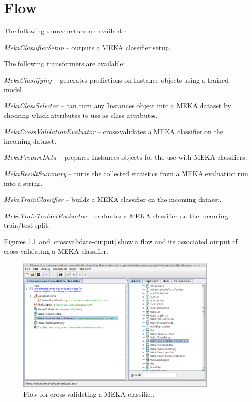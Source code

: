 \documentclass[a4paper]{book}
\begin{document}
\chapter{Flow}
The following source actors are available:
\begin{tight_itemize}
	\item \textit{MekaClassifierSetup} -- outputs a MEKA classifier setup.
\end{tight_itemize}
The following transformers are available:
\begin{tight_itemize}
	\item \textit{MekaClassifying} -- generates predictions on Instance objects
	using a trained model.
	\item \textit{MekaClassSelector} -- can turn any Instances object into
	a MEKA dataset by choosing which attributes to use as class attributes.
	\item \textit{MekaCrossValidationEvaluator} -- cross-validates a MEKA 
	classifier on the incoming dataset.
	\item \textit{MekaPrepareData} -- prepares Instances objects for the 
	use with MEKA classifiers.
	\item \textit{MekaResultSummary} -- turns the collected statistics from
	a MEKA evaluation run into a string.
	\item \textit{MekaTrainClassifier} -- builds a MEKA classifier on the
	incoming dataset.
	\item \textit{MekaTrainTestSetEvaluator} -- evaluates a MEKA classifier
	on the incoming train/test split.
\end{tight_itemize}

\newpage
Figures \ref{crossvalidate-flow} and \ref{crossvalidate-output} show a flow
and its associated output of cross-validating a MEKA classifier.

\begin{figure}[htb]
  \centering
  \includegraphics[width=10.0cm]{images/crossvalidate-flow.png}
  \caption{Flow for cross-validating a MEKA classifier.}
  \label{crossvalidate-flow}
\end{figure}
\end{document}
